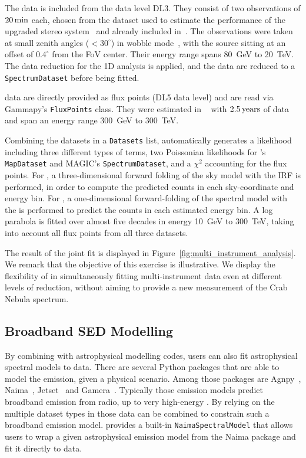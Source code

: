 \documentclass[longauth]{aa}
\newcommand{\code}[1]{\texttt{#1}}
\begin{document}
The \magic data is included from the data level DL3. They consist of two
observations of $20\,{\rm min}$ each, chosen from the dataset used to estimate
the performance of the upgraded stereo system~\citep{magic_performance} and
already included in~\cite{joint_crab}. The observations were taken at small
zenith angles ($<30^{\circ}$) in wobble mode~\citep{fomin_1994}, with the
source sitting at an offset of $0.4^{\circ}$ from the FoV center. Their energy
range spans \SI{80}{GeV} to \SI{20}{TeV}. The data reduction for the 1D analysis
is applied, and the data are reduced to a \code{SpectrumDataset} before being fitted.

\hawc data are directly provided as flux points (DL5 data level) and are read
via Gammapy's \code{FluxPoints} class. They were estimated in ~\cite{hawc_crab_2019}
with $2.5\,{\rm years}$ of data and span an energy range \SI{300}{GeV} to \SI{300}{TeV}.

Combining the datasets in a \code{Datasets} list, \gammapy automatically generates
a likelihood including three different types of terms, two Poissonian likelihoods
for \fermi's \code{MapDataset} and MAGIC's \code{SpectrumDataset}, and a $\chi^2$
accounting for the \hawc flux points. For \fermi, a three-dimensional forward folding
of the sky model with the IRF is performed, in order to compute the predicted counts
in each sky-coordinate and energy bin. For \magic, a one-dimensional forward-folding
of the spectral model with the \irfs is performed to predict the counts in each estimated energy bin. A log
parabola is fitted over almost five decades in energy \SI{10}{GeV} to \SI{300}{TeV}, taking into account all flux points from all three datasets.

The result of the joint fit is displayed in
Figure~\ref{fig:multi_instrument_analysis}. We remark that the objective of this
exercise is illustrative. We display the flexibility of \gammapy in
simultaneously fitting multi-instrument data even at different levels of
reduction, without aiming to provide a new measurement of the Crab Nebula
spectrum.


\subsection{Broadband SED Modelling}
\label{ssec:broadband-sed-modeling}
By combining \gammapy with astrophysical modelling codes, users can also fit
astrophysical spectral models to \gammaray data. 
There are several Python packages that are able to model
the \gammaray emission, given a physical scenario. Among those
packages are Agnpy~\citep{agnpy2022}, Naima~\citep{naima}, Jetset~\citep{jetset}
and Gamera~\citep{gamera}.
Typically those emission models predict broadband emission from
radio, up to very high-energy \gammarays.
By relying on the multiple dataset types in \gammapy those
data can be combined to constrain such a broadband emission model.
\gammapy provides a built-in \code{NaimaSpectralModel} that allows
users to wrap a given astrophysical emission model from the
Naima package and fit it directly to \gammaray data.
\end{document}
